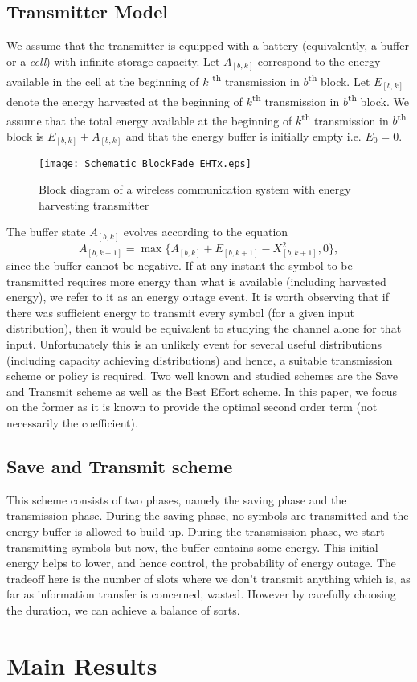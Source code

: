 \documentclass[conference]{IEEEtran}
\begin{document}
\subsection{Transmitter Model}\label{Txmod}
We assume that the transmitter is equipped with a battery (equivalently, a buffer or a \emph{cell}) with infinite storage capacity. Let $A_{[b,k]}$ correspond to the energy available in the cell at the beginning of $k$ \textsuperscript{th} transmission in $b$\textsuperscript{th} block. Let $E_{[b,k]}$ denote the energy harvested at the beginning of $k$\textsuperscript{th} transmission in $b$\textsuperscript{th} block. We assume that the total energy available at the beginning of $k$\textsuperscript{th} transmission in $b$\textsuperscript{th} block is $E_{[b,k]}+A_{[b,k]}$ and that the energy buffer is initially empty i.e. $E_0 = 0$. 
\begin{figure}[h]
\texttt{[image: Schematic\_BlockFade\_EHTx.eps]}
\caption{Block diagram of a wireless communication system with energy harvesting transmitter}
\label{Fig_Schematic}
\end{figure}

The buffer state $A_{[b,k]}$ evolves according to the equation
\begin{equation}
	A_{[b,k+1]} = \max\{A_{[b,k]} + E_{[b,k+1]} - X^2_{[b,k+1]}, 0 \},
\end{equation}
since the buffer cannot be negative. If at any instant the symbol to be transmitted requires more energy than what is available (including harvested energy), we refer to it as an energy outage event. It is worth observing that if there was sufficient energy to transmit every symbol (for a given input distribution), then it would be equivalent to studying the channel alone for that input. Unfortunately this is an unlikely event for several useful distributions (including capacity achieving distributions) and hence, a suitable transmission scheme or policy is required. Two well known and studied schemes are the Save and Transmit scheme as well as the Best Effort scheme. In this paper, we focus on the former as it is known to provide the optimal second order term (not necessarily the coefficient). 

\subsection{Save and Transmit scheme}
This scheme consists of two phases, namely the saving phase and the transmission phase. During the saving phase, no symbols are transmitted and the energy buffer is allowed to build up. During the transmission phase, we start transmitting symbols but now, the buffer contains some energy. This initial energy helps to lower, and hence control, the probability of energy outage. The tradeoff here is the number of slots where we don't transmit anything which is, as far as information transfer is concerned, wasted. However by carefully choosing the duration, we can achieve a balance of sorts.

\section{Main Results}



\end{document}
